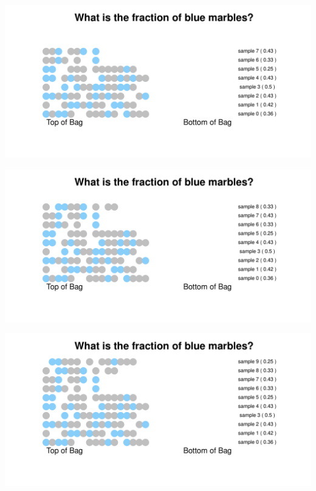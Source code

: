 \documentclass[aspectratio=169]{beamer}
\theoremstyle{principle}
\begin{document}
\begin{frame}
\begin{center}
\includegraphics[scale=0.57]{sample_7.pdf}
\end{center}
\end{frame}

\begin{frame}
\begin{center}
\includegraphics[scale=0.57]{sample_8.pdf}
\end{center}
\end{frame}

\begin{frame}
\begin{center}
\includegraphics[scale=0.57]{sample_9.pdf}
\end{center}
\end{frame}
\end{document}
